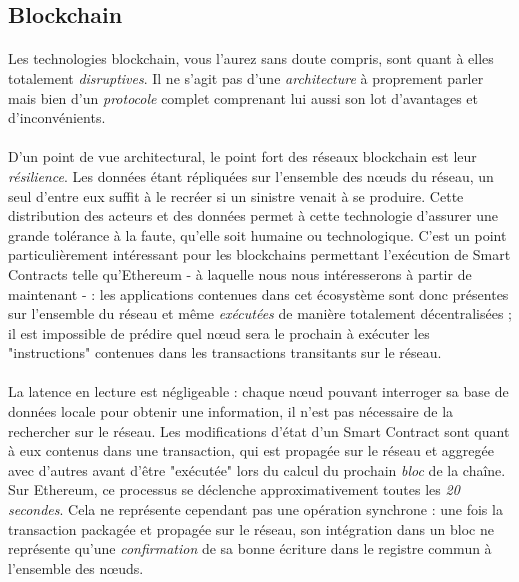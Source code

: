 \subsection*{Blockchain}

\paragraph{} Les technologies blockchain, vous l'aurez sans doute compris, sont quant à elles totalement \emph{disruptives}.
Il ne s'agit pas d'une \emph{architecture} à proprement parler mais bien d'un \emph{protocole} complet comprenant lui aussi
son lot d'avantages et d'inconvénients.

\paragraph{} D'un point de vue architectural, le point fort des réseaux blockchain est leur \emph{résilience}. Les données
étant répliquées sur l'ensemble des n\oe{}uds du réseau, un seul d'entre eux suffit à le recréer si un sinistre venait à se
produire. Cette distribution des acteurs et des données permet à cette technologie d'assurer une grande tolérance à la faute,
qu'elle soit humaine ou technologique. C'est un point particulièrement intéressant pour les blockchains permettant l'exécution
de Smart Contracts telle qu'Ethereum - à laquelle nous nous intéresserons à partir de maintenant - : les applications contenues
dans cet écosystème sont donc présentes sur l'ensemble du réseau et même \emph{exécutées} de manière totalement décentralisées ;
il est impossible de prédire quel n\oe{}ud sera le prochain à exécuter les "instructions" contenues dans les transactions 
transitants sur le réseau.

\paragraph{} La latence en lecture est négligeable : chaque n\oe{}ud pouvant interroger sa base de données locale pour obtenir
une information, il n'est pas nécessaire de la rechercher sur le réseau. Les modifications d'état d'un Smart Contract sont
quant à eux contenus dans une transaction, qui est propagée sur le réseau et aggregée avec d'autres avant d'être "exécutée"
lors du calcul du prochain \emph{bloc} de la chaîne. Sur Ethereum, ce processus se déclenche approximativement toutes les
\emph{20 secondes}. Cela ne représente cependant pas une opération synchrone : une fois la transaction packagée et propagée
sur le réseau, son intégration dans un bloc ne représente qu'une \emph{confirmation} de sa bonne écriture dans le registre 
commun à l'ensemble des n\oe{}uds.

